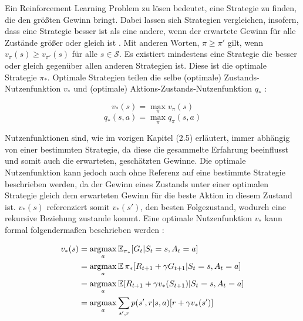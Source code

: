 Ein Reinforcement Learning Problem zu lösen bedeutet, eine Strategie zu finden, die den größten Gewinn bringt. Dabei lassen sich Strategien vergleichen, insofern, dass eine Strategie besser ist als eine andere, wenn der erwartete Gewinn für alle Zustände größer oder gleich ist \cite[S.~62f]{Sutton1998}. Mit anderen Worten, $\pi \geq \pi'$ gilt, wenn $v_\pi(s) \geq v_{\pi'}(s)$ für alle $s \in \mathcal{S}$. Es existiert mindestens eine Strategie die besser oder gleich gegenüber allen anderen Strategien ist. Diese ist die optimale Strategie $\pi_*$. Optimale Strategien teilen die selbe (optimale) Zustands-Nutzenfunktion $v_*$ und (optimale) Aktions-Zustands-Nutzenfunktion $q_*$ \cite[S.~62f]{Sutton1998}:

\begin{equation}\label{eq:optimaleValueFunction}
    v_*(s) = \max_\pi v_\pi(s)
\end{equation}
\begin{equation}\label{eq:optimaleActionValueFunction}
    q_*(s,a) = \max_\pi q_\pi(s,a)
\end{equation}

Nutzenfunktionen sind, wie im vorigen Kapitel (2.5) erläutert, immer abhängig von einer bestimmten Strategie, da diese die gesammelte Erfahrung beeinflusst und somit auch die erwarteten, geschätzten Gewinne. Die optimale Nutzenfunktion kann jedoch auch ohne Referenz auf eine bestimmte Strategie beschrieben werden, da der Gewinn eines Zustands unter einer optimalen Strategie gleich dem erwarteten Gewinn für die beste Aktion in diesem Zustand ist. $v_*(s)$ referenziert somit $v_*(s')$, den besten Folgezustand, wodurch eine rekursive Beziehung zustande kommt. Eine optimale Nutzenfunktion $v_*$ kann formal folgendermaßen beschrieben werden \cite[S.~63]{Sutton1998}:

\begin{equation}\label{eq:bellmanValue}
    \begin{aligned}
        v_*(s) &= \operatorname*{argmax}_a \operatorname{\mathbb{E}}_{\pi_*}[G_t | S_t = s, A_t = a] \\
        &= \operatorname*{argmax}_a \operatorname{\mathbb{E}}{\pi_*}[ R_{t+1} + \gamma G_{t+1} | S_t = s, A_t = a] \\
        &= \operatorname*{argmax}_a \operatorname{\mathbb{E}}[ R_{t+1} + \gamma v_*(S_{t+1}) | S_t = s, A_t = a] \\
        &= \operatorname*{argmax}_a \sum_{s',r}p(s', r | s,a)[r+ \gamma v_*(s')]
    \end{aligned}
\end{equation}

